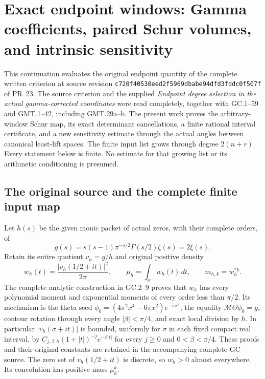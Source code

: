\begingroup
\def\C{\mathbb{C}}
\def\R{\mathbb{R}}
\def\Tr{\operatorname{Tr}}
\def\diag{\operatorname{diag}}
\section{Exact endpoint windows: Gamma coefficients, paired Schur volumes, and intrinsic sensitivity}



This continuation evaluates the original endpoint quantity of the complete
written criterion at source revision
\nolinkurl{c720f40530eed2f5969dbabe94dfd3fddc0f507f} of PR~23.
The source criterion and the supplied \emph{Endpoint degree selection in
the actual gamma-corrected coordinates} were read completely, together
with GC.1--59 and GMT.1--42, including GMT.29a--b. The present work proves
the arbitrary-window Schur map, its exact determinant cancellations, a
finite rational interval certificate, and a new sensitivity estimate
through the actual angles between canonical least-lift spaces. The
finite input list grows through degree $2(n+r)$. Every statement below
is finite. No estimate for that growing list or its arithmetic
conditioning is presumed.

\subsection{The original source and the complete finite input map}

Let $h(s)$ be the given monic packet of actual zeros, with their complete
orders, of
\[
 g(s)=s(s-1)\pi^{-s/2}\Gamma(s/2)\zeta(s)=2\xi(s).
\]
Retain its entire quotient $v_h=g/h$ and original positive density
\[
 w_h(t)=\frac{|v_h(1/2+it)|^2}{2\pi},\qquad
 \mu_h=\int_{\R} w_h(t)\,dt,\qquad m_{h,k}=w_h^{*k}.
                                                               \tag{EW.1}
\]
The complete analytic construction in GC.2--9 proves that $w_h$ has
every polynomial moment and exponential moments of every order less
than $\pi/2$. Its mechanism is the theta seed
$\phi_0=(4\pi^2x^4-6\pi x^2)e^{-\pi x^2}$, the equality
$\mathcal M\Theta\phi_0=g$, contour rotation through every angle
$|\beta|<\pi/4$, and exact local division by $h$.
In particular $|v_h(\sigma+it)|$ is bounded, uniformly for $\sigma$
in each fixed compact real interval, by
$C_{j,\beta,h}(1+|t|)^{-j}e^{-\beta|t|}$ for every
$j\ge0$ and $0<\beta<\pi/4$. These proofs and their original
constants are retained in the accompanying complete GC source.
The zero set of $v_h(1/2+it)$ is discrete, so $w_h>0$ almost
everywhere. Its convolution has positive mass $\mu_h^k$.

